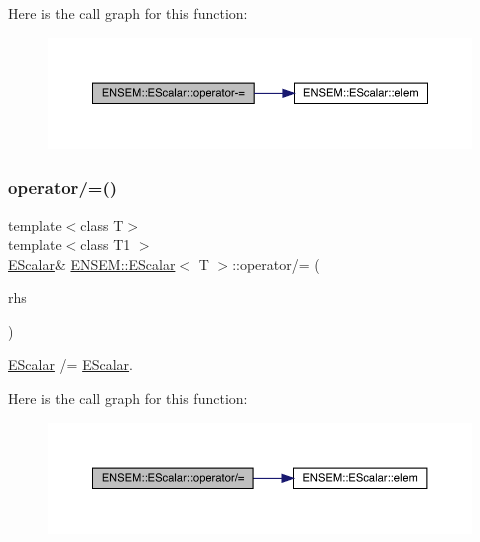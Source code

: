 Here is the call graph for this function\+:
\nopagebreak
\begin{figure}[H]
\begin{center}
\leavevmode
\includegraphics[width=350pt]{d0/d82/classENSEM_1_1EScalar_a2ed33688ab765d0e4d15b391b3f61f33_cgraph}
\end{center}
\end{figure}
\mbox{\label{classENSEM_1_1EScalar_a09524cf0f6f5baf9c421d03df58fe8d6}} 
\subsubsection{\texorpdfstring{operator/=()}{operator/=()}\hspace{0.1cm}{\footnotesize\ttfamily [1/3]}}
{\footnotesize\ttfamily template$<$class T$>$ \\
template$<$class T1 $>$ \\
\mbox{\hyperlink{classENSEM_1_1EScalar}{E\+Scalar}}\& \mbox{\hyperlink{classENSEM_1_1EScalar}{E\+N\+S\+E\+M\+::\+E\+Scalar}}$<$ T $>$\+::operator/= (\begin{DoxyParamCaption}\item[{const \mbox{\hyperlink{classENSEM_1_1EScalar}{E\+Scalar}}$<$ T1 $>$ \&}]{rhs }\end{DoxyParamCaption})\hspace{0.3cm}{\ttfamily [inline]}}



\mbox{\hyperlink{classENSEM_1_1EScalar}{E\+Scalar}} /= \mbox{\hyperlink{classENSEM_1_1EScalar}{E\+Scalar}}. 

Here is the call graph for this function\+:
\nopagebreak
\begin{figure}[H]
\begin{center}
\leavevmode
\includegraphics[width=350pt]{d0/d82/classENSEM_1_1EScalar_a09524cf0f6f5baf9c421d03df58fe8d6_cgraph}
\end{center}
\end{figure}
\mbox{\label{classENSEM_1_1EScalar_a09524cf0f6f5baf9c421d03df58fe8d6}} 
